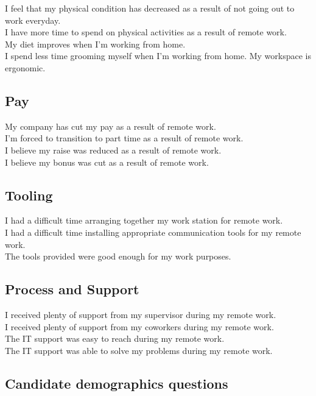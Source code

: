 \documentclass[12pt]{article}
\begin{document}
I feel that my physical condition has decreased as a result of not going out to work everyday.  \\
I have more time to spend on physical activities as a result of remote work. \\
My diet improves when I’m working from home.  \\
I spend less time grooming myself when I’m working from home.
My workspace is ergonomic. 

\subsection*{Pay}

My company has cut my pay as a result of remote work. \\
I’m forced to transition to part time as a result of remote work. \\
I believe my raise was reduced as a result of remote work. \\
I believe my bonus was cut as a result of remote work. 

\subsection*{Tooling} 

I had a difficult time arranging together my work station for remote work.  \\
I had a difficult time installing appropriate communication tools for my remote work.  \\
The tools  provided were good enough for my work purposes. 

\subsection*{Process and Support}

I received plenty of support from my supervisor during my remote work. \\
I received plenty of support from my coworkers during my remote work. \\
The IT support was easy to reach during my remote work. \\
The IT support was able to solve my problems during my remote work.


\subsection*{Candidate demographics questions}
\end{document}
